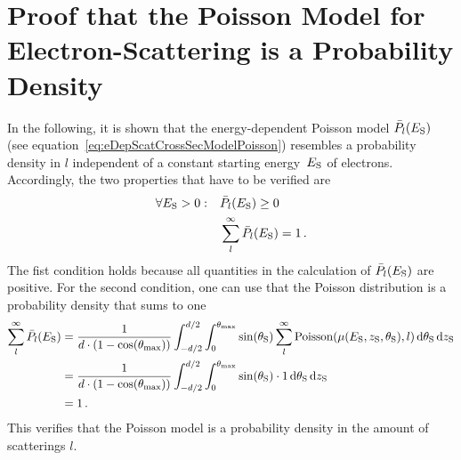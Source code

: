 \section{Proof that the Poisson Model for Electron-Scattering is a Probability Density}
\label{sec:appendixEDepScatCrossSecPoissonModelProbDensityProof}
In the following, it is shown that the energy-dependent Poisson model $\bar{P}_l(E_\mathrm{S})$ (see equation~\ref{eq:eDepScatCrossSecModelPoisson}) resembles a probability density in $l$ independent of a constant starting energy~$E_\mathrm{S}$ of electrons. Accordingly, the two properties that have to be verified are
\begin{align}
\forall E_\mathrm{S} > 0: \quad
&\bar{P}_l(E_\mathrm{S}) \geq 0 \\
&\sum_{l}^{\infty} \bar{P}_l(E_\mathrm{S}) = 1
\text{\,.}
\end{align}
The fist condition holds because all quantities in the calculation of $\bar{P}_l(E_\mathrm{S})$ are positive. For the second condition, one can use that the Poisson distribution is a probability density that sums to one
\begin{align*}
\sum_{l}^{\infty} \bar{P}_l(E_\mathrm{S}) &=
\frac{1}{d \cdot (1-\cos(\theta_\mathrm{max}))} 
\int_{-d/2}^{d/2}  
\int_{0}^{\theta_\mathrm{max}} 
\sin(\theta_\mathrm{S})
\sum_{l}^{\infty}
\mathrm{Poisson}(\mu(E_\mathrm{S},z_\mathrm{S},\theta_\mathrm{S}),l)
\mathop{}\!\mathrm{d}\theta_\mathrm{S}
\mathop{}\!\mathrm{d}z_\mathrm{S} \\  &=
\frac{1}{d \cdot (1-\cos(\theta_\mathrm{max}))} 
\int_{-d/2}^{d/2}  
\int_{0}^{\theta_\mathrm{max}} 
\sin(\theta_\mathrm{S})
\cdot 1
\mathop{}\!\mathrm{d}\theta_\mathrm{S}
\mathop{}\!\mathrm{d}z_\mathrm{S} \\ &= 1
\text{\,.}
\end{align*}
This verifies that the Poisson model is a probability density in the amount of scatterings $l$.
\clearpage

